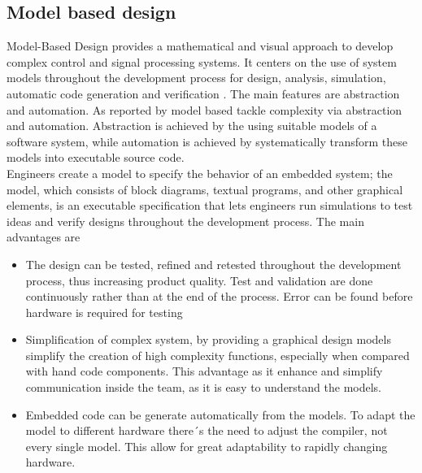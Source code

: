 \documentclass[../main.tex]{subfiles}
\begin{document}
\subsection{Model based design}
Model-Based Design provides a mathematical and visual approach to develop complex control and signal processing systems. It centers on the use of system models throughout the development process for design, analysis, simulation, automatic code generation and verification \cite{Mathworks}. The main features are abstraction and automation. As reported by \cite{modelbased} model based tackle complexity via abstraction and automation. Abstraction is achieved by the using suitable models of a software system, while automation is achieved by systematically transform these models into executable source code.\\
Engineers create a model to specify the behavior of an embedded system; the model, which consists of block diagrams, textual programs, and other graphical elements, is an executable specification that lets engineers run simulations to test ideas and verify designs throughout the development process. The main advantages are
\begin{itemize}
    \item The design can be tested, refined and retested throughout the development process, thus increasing product quality. Test and validation are done continuously rather than at the end of the process. Error can be found before hardware is required for testing
    \item Simplification of complex system, by providing a graphical design models simplify the creation of high complexity functions, especially when compared with hand code components. This advantage as it enhance and simplify communication inside the team, as it is easy to understand the models. 
    \item Embedded code can be generate automatically from the models. To adapt the model to different hardware there´s the need to adjust the compiler, not every single model. This allow for great adaptability to rapidly changing hardware. 
\end{itemize}

\cleardoublepage
\end{document}
